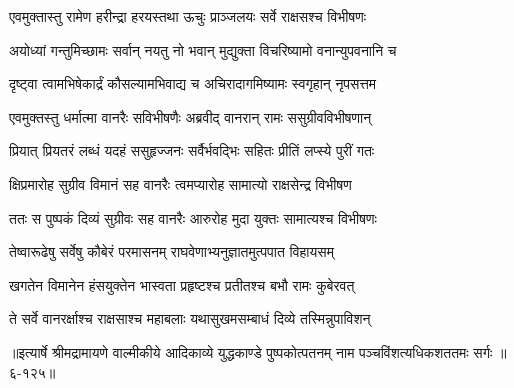 \twolineshloka
{एवमुक्तास्तु रामेण हरीन्द्रा हरयस्तथा}
{ऊचुः प्राञ्जलयः सर्वे राक्षसश्च विभीषणः} %

\twolineshloka
{अयोध्यां गन्तुमिच्छामः सर्वान् नयतु नो भवान्}
{मुद्युक्ता विचरिष्यामो वनान्युपवनानि च} %

\twolineshloka
{दृष्ट्वा त्वामभिषेकार्द्रं कौसल्यामभिवाद्य च}
{अचिरादागमिष्यामः स्वगृहान् नृपसत्तम} %

\twolineshloka
{एवमुक्तस्तु धर्मात्मा वानरैः सविभीषणैः}
{अब्रवीद् वानरान् रामः ससुग्रीवविभीषणान्} %

\twolineshloka
{प्रियात् प्रियतरं लब्धं यदहं ससुहृज्जनः}
{सर्वैर्भवद्भिः सहितः प्रीतिं लप्स्ये पुरीं गतः} %

\twolineshloka
{क्षिप्रमारोह सुग्रीव विमानं सह वानरैः}
{त्वमप्यारोह सामात्यो राक्षसेन्द्र विभीषण} %

\twolineshloka
{ततः स पुष्पकं दिव्यं सुग्रीवः सह वानरैः}
{आरुरोह मुदा युक्तः सामात्यश्च विभीषणः} %

\twolineshloka
{तेष्वारूढेषु सर्वेषु कौबेरं परमासनम्}
{राघवेणाभ्यनुज्ञातमुत्पपात विहायसम्} %

\twolineshloka
{खगतेन विमानेन हंसयुक्तेन भास्वता}
{प्रहृष्टश्च प्रतीतश्च बभौ रामः कुबेरवत्} %

\twolineshloka
{ते सर्वे वानरर्क्षाश्च राक्षसाश्च महाबलाः}
{यथासुखमसम्बाधं दिव्ये तस्मिन्नुपाविशन्} %


॥इत्यार्षे श्रीमद्रामायणे वाल्मीकीये आदिकाव्ये युद्धकाण्डे पुष्पकोत्पतनम् नाम पञ्चविंशत्यधिकशततमः सर्गः ॥६-१२५॥
